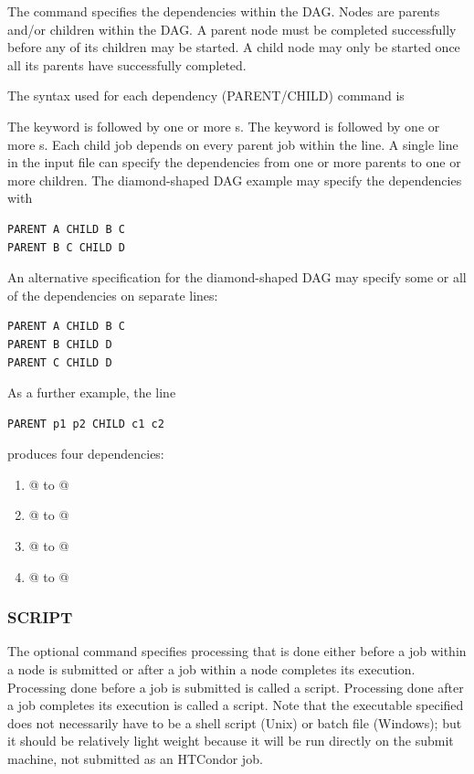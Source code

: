 The   command specifies the
dependencies within the DAG.
Nodes are parents and/or children within the DAG.
A parent node must be completed successfully before
any of its children may be started.
A child node may only be started once
all its parents have successfully completed.

The syntax used for each dependency (PARENT/CHILD) command is

   

The  keyword is followed by one or more
s.
The  keyword is followed by one or more
s.
Each child job depends on every parent job within the line.
A single line in the input file can specify the dependencies from one or more
parents to one or more children.
The diamond-shaped DAG example may specify the dependencies with
\begin{verbatim}
PARENT A CHILD B C
PARENT B C CHILD D
\end{verbatim}
An alternative specification for the diamond-shaped DAG
may specify some or all of the dependencies on separate lines:
\begin{verbatim}
PARENT A CHILD B C
PARENT B CHILD D
PARENT C CHILD D
\end{verbatim}

As a further example, the line
\begin{verbatim}
PARENT p1 p2 CHILD c1 c2
\end{verbatim}
produces four dependencies:
\begin{enumerate}
\item{@ to @}
\item{@ to @}
\item{@ to @}
\item{@ to @}
\end{enumerate}

\subsubsection{\label{sec:dagman_script_command}SCRIPT}
\label{dagman:SCRIPT}

The optional  command specifies
processing that is done either before a job within
a node is submitted
or after a job within a node completes its execution.
Processing done before a job is submitted is
called a  script.
Processing done after a job completes its execution is
called a  script.
Note that the executable specified does not necessarily
have to be a shell script (Unix) or batch file (Windows);
but it should be relatively light weight because it will
be run directly on the submit machine, not submitted as
an HTCondor job.

